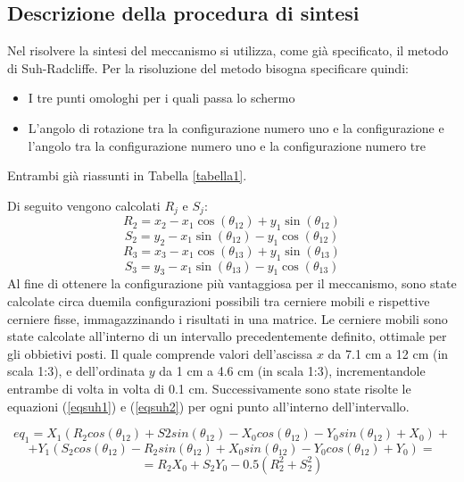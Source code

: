 \documentclass{article}
\begin{document}
\subsection{Descrizione della procedura di sintesi}
Nel risolvere la sintesi del meccanismo si utilizza, come già specificato, il metodo di Suh-Radcliffe.
Per la risoluzione del metodo bisogna specificare quindi:
\begin{itemize}
    \item I tre punti omologhi per i quali passa lo schermo
    \item L’angolo di rotazione tra la configurazione numero uno e la configurazione e l'angolo tra la configurazione numero uno e la configurazione numero tre
\end{itemize}
Entrambi già riassunti in Tabella \ref{tabella1}.

Di seguito vengono calcolati $R_j$ e $S_j$:
\begin{equation}
    R_2 = x_2 - x_1 \cos(\theta_{12}) + y_1 \sin(\theta_{12})
\end{equation}
\begin{equation}
     S_2 = y_2 - x_1 \sin(\theta_{12}) - y_1 \cos(\theta_{12})
\end{equation}
\begin{equation}
    R_3 = x_3 - x_1 \cos(\theta_{13}) + y_1 \sin(\theta_{13}) 
\end{equation}
\begin{equation}
    S_3 = y_3 - x_1 \sin(\theta_{13}) - y_1 \cos(\theta_{13})
\end{equation}
Al fine di ottenere la configurazione più vantaggiosa per il meccanismo, sono state calcolate circa duemila configurazioni possibili tra cerniere mobili e rispettive cerniere fisse, immagazzinando i risultati in una matrice. Le cerniere mobili sono state calcolate all'interno di un intervallo precedentemente definito, ottimale per gli obbietivi posti. Il quale comprende valori dell’ascissa $x$  da 7.1 cm a 12 cm (in scala 1:3), e dell’ordinata $y$ da 1 cm a 4.6 cm (in scala 1:3), incrementandole entrambe di volta in volta di 0.1 cm.  Successivamente sono state risolte le equazioni (\ref{eqsuh1}) e (\ref{eqsuh2}) per ogni punto all’interno dell’intervallo. 

\begin{equation*}
    eq_1 = X_1(R_2 cos(\theta_{12})+S2sin(\theta_{12})-X_0cos(\theta_{12})-Y_0sin(\theta_{12})+X_0)+
\end{equation*}
\begin{equation}
    +Y_1(S_2cos(\theta_{12})-R_2sin(\theta_{12})+X_0sin(\theta_{12})-Y_0cos(\theta_{12})+Y_0)=
    \label{eqsuh1}
\end{equation}
\begin{equation*}
    =R_2X_0+S_2Y_0-0.5(R_2^2+S_2^2)
\end{equation*}
\end{document}
